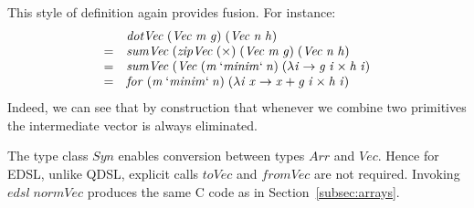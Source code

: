 \documentclass[authoryear,9pt]{sigplanconf}
\newcommand{\Conid}[1]{\mathit{#1}}
\newcommand{\Varid}[1]{\mathit{#1}}
\begin{document}
This style of definition again provides fusion. For instance:
\[
\begin{array}{cl}
  &  \ensuremath{\Varid{dotVec}\;(\Conid{Vec}\;\Varid{m}\;\Varid{g})\;(\Conid{Vec}\;\Varid{n}\;\Varid{h})}  \\
= &  \ensuremath{\Varid{sumVec}\;(\Varid{zipVec}\;(\times)\;(\Conid{Vec}\;\Varid{m}\;\Varid{g})\;(\Conid{Vec}\;\Varid{n}\;\Varid{h})}  \\
= &  \ensuremath{\Varid{sumVec}\;(\Conid{Vec}\;(\Varid{m}\mathbin{`\Varid{minim}`}\Varid{n})\;(\lambda \Varid{i}\to \Varid{g}\;\Varid{i}\times\Varid{h}\;\Varid{i})}  \\
= &  \ensuremath{\Varid{for}\;(\Varid{m}\mathbin{`\Varid{minim}`}\Varid{n})\;(\lambda \Varid{i}\;\Varid{x}\to \Varid{x}\mathbin{+}\Varid{g}\;\Varid{i}\times\Varid{h}\;\Varid{i})}
\end{array}
\]
Indeed, we can see that by construction that whenever we combine two
primitives the intermediate vector is always eliminated.

The type class \ensuremath{\Conid{Syn}} enables conversion between types \ensuremath{\Conid{Arr}} and \ensuremath{\Conid{Vec}}.
Hence for EDSL, unlike QDSL, explicit calls \ensuremath{\Varid{toVec}} and \ensuremath{\Varid{fromVec}} are
not required.  Invoking \ensuremath{\Varid{edsl}\;\Varid{normVec}} produces the same C code as in
Section~\ref{subsec:arrays}.
\end{document}
